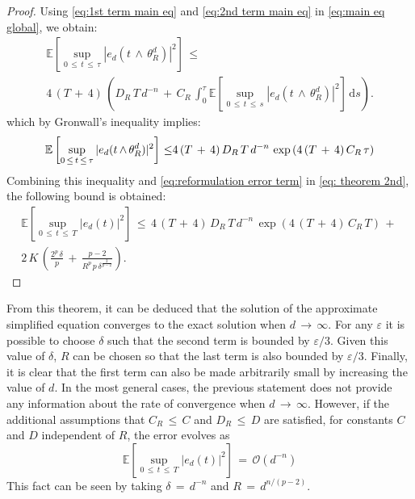\begin{proof}
    Using \eqref{eq:1st term main eq} and \eqref{eq:2nd term main eq} in
    \eqref{eq:main eq global}, we obtain:
    \begin{multline*}
        \mathbb E \left[ \sup_{0\, {\leq} \,t\, {\leq} \,{\tau}} |e_d(t\,{\wedge}\,{\theta}_R^d)|^2\right]\, {\leq} \,\\
        4\,(T\,+\,4)\,\left(D_R\,T \,d^{-n}\,+\,C_R\,{\int}_0^{{\tau}}\mathbb
            E\left[\sup_{0\, {\leq} \,t\, {\leq} \,s}|e_d(t \,{\wedge}\, {\theta}_R^d)|^2\right]\,\mathrm ds\right).
    \end{multline*}
    which by Gronwall's inequality implies:
    \begin{equation}
        \mathbb E \left[ \sup_{0\, {\leq} \,t\, {\leq} \,{\tau}} |e_d(t\,{\wedge}\,{\theta}_R^d)|^2\right]\, {\leq} \,\\
        4\,(T\,+\,4)\,D_R\,T\,d^{-n}\,\exp \left(4\,(T\,+\,4)\,C_R\, {\tau}\right)
    \end{equation}
    Combining this inequality and \eqref{eq:reformulation error term} in \eqref{eq:
        theorem 2nd}, the following bound is obtained:
    \begin{multline}
        \mathbb E \left[\sup_{0\, {\leq} \,t\, {\leq} \,T} |e_d(t)|^2 \right]
        \, {\leq} \,4\,(T\,+\,4)\,D_R\,T\,d^{-n}\,\exp \left(4\,(T\,+\,4)\,C_R\, T\right)
        \,+\, \\ 2\,K\,
        \left(\frac{2^p\,{\delta}}{p}\,+\,\frac{p-2}{R^p\,p\,{\delta}^{\frac{2}{p-2}}}\right).
        \label{eq: theorem 2nd}        
    \end{multline}
\end{proof}
\noindent From this theorem, it can be deduced that the solution of the approximate
simplified equation converges to the exact solution when $d\,\to\,{\infty}$. For any ${\varepsilon}$ it
is possible to choose ${\delta}$ such that the second term is bounded by
${\varepsilon}/3$. Given this value of ${\delta}$, $R$ can be chosen so that the last
term is also bounded by ${\varepsilon}/3$. Finally, it is clear that the first term can also
be made arbitrarily small by increasing the value of $d$.  In the most general
cases, the previous statement does not provide any information about the rate
of convergence when $d\,\to\,{\infty}$. However, if the additional assumptions
that $C_R\, {\leq} \,C$ and  $D_R\, {\leq} \,D$ are satisfied, for constants
$C$ and $D$ independent of $R$, the error evolves as
$$
\mathbb E \left[\sup_{0\, {\leq} \,t\, {\leq} \,T} |e_d(t)|^2 \right]\,=\,\mathcal O(d^{-n})
$$
This fact can be seen by taking ${\delta}\,=\, d^{-n}$ and $R\,=\,d^{n/(p-2)}$.

